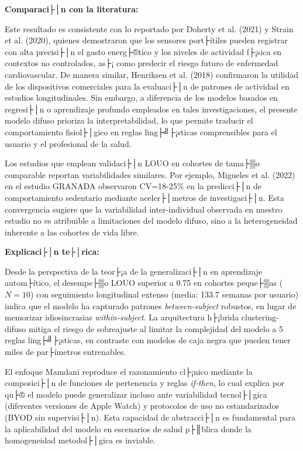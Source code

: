 \textbf{Comparaci├│n con la literatura:}

Este resultado es consistente con lo reportado por Doherty et al. (2021) y Strain et al. (2020), quienes demostraron que los sensores port├ítiles pueden registrar con alta precisi├│n el gasto energ├®tico y los niveles de actividad f├¡sica en contextos no controlados, as├¡ como predecir el riesgo futuro de enfermedad cardiovascular. De manera similar, Henriksen et al. (2018) confirmaron la utilidad de los dispositivos comerciales para la evaluaci├│n de patrones de actividad en estudios longitudinales. Sin embargo, a diferencia de los modelos basados en regresi├│n o aprendizaje profundo empleados en tales investigaciones, el presente modelo difuso prioriza la interpretabilidad, lo que permite traducir el comportamiento fisiol├│gico en reglas ling├╝├¡sticas comprensibles para el usuario y el profesional de la salud.

Los estudios que emplean validaci├│n LOUO en cohortes de tama├▒o comparable reportan variabilidades similares. Por ejemplo, Migueles et al. (2022) en el estudio GRANADA observaron CV=18-25\% en la predicci├│n de comportamiento sedentario mediante aceler├│metros de investigaci├│n. Esta convergencia sugiere que la variabilidad inter-individual observada en nuestro estudio no es atribuible a limitaciones del modelo difuso, sino a la heterogeneidad inherente a las cohortes de vida libre.

\textbf{Explicaci├│n te├│rica:}

Desde la perspectiva de la teor├¡a de la generalizaci├│n en aprendizaje autom├ítico, el desempe├▒o LOUO superior a 0.75 en cohortes peque├▒as ($N=10$) con seguimiento longitudinal extenso (media: 133.7 semanas por usuario) indica que el modelo ha capturado patrones \textit{between-subject} robustos, en lugar de memorizar idiosincrasias \textit{within-subject}. La arquitectura h├¡brida clustering-difuso mitiga el riesgo de sobreajuste al limitar la complejidad del modelo a 5 reglas ling├╝├¡sticas, en contraste con modelos de caja negra que pueden tener miles de par├ímetros entrenables.

El enfoque Mamdani reproduce el razonamiento cl├¡nico mediante la composici├│n de funciones de pertenencia y reglas \textit{if-then}, lo cual explica por qu├® el modelo puede generalizar incluso ante variabilidad tecnol├│gica (diferentes versiones de Apple Watch) y protocolos de uso no estandarizados (BYOD sin supervisi├│n). Esta capacidad de abstracci├│n es fundamental para la aplicabilidad del modelo en escenarios de salud p├║blica donde la homogeneidad metodol├│gica es inviable.


